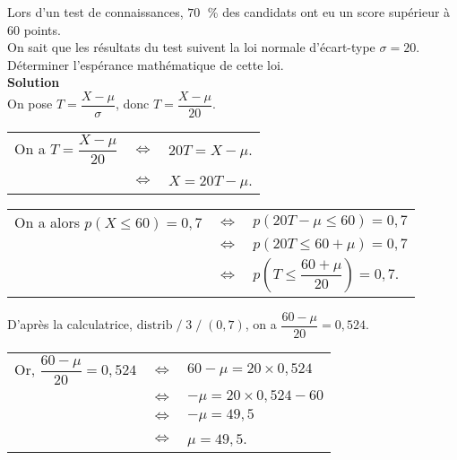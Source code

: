 Lors d'un test de connaissances, $70 \;$ \% des candidats ont eu un score supérieur à $60$ points. \\
On sait que les résultats du test suivent la loi normale d'écart-type $\sigma = 20$. \\

Déterminer l'espérance mathématique de cette loi. \\

\textbf{Solution} \\

On pose $T = \dfrac{X - \mu}{\sigma}$, donc $T = \dfrac{X - \mu}{20}$. \\

\begin{tabular}{lll}
\hspace*{-.3cm} On a $T = \dfrac{X - \mu}{20}$ & $\Longleftrightarrow$ & $20T = X - \mu$. \\
& $\Longleftrightarrow$ & $X = 20T - \mu$. \\
\end{tabular}

\vspace*{.3cm}

\begin{tabular}{lll}
\hspace*{-.3cm} On a alors $p\left(X \leqslant 60\right) = 0,7$ & $\Longleftrightarrow$ & $p\left(20T - \mu \leqslant 60\right) = 0,7$ \vspace*{.3cm} \\
& $\Longleftrightarrow$ & $p\left(20T \leqslant 60 + \mu\right) = 0,7$ \vspace*{.3cm} \\
& $\Longleftrightarrow$ & $p\left(T \leqslant \dfrac{60 + \mu}{20}\right) = 0,7$. \\
\end{tabular}

\vspace*{.3cm}

D'après la calculatrice, $\mathrm{distrib \;} / \; 3 \; / \; \left(0,7\right)$, on a $\dfrac{60 - \mu}{20} = 0,524$. \\

\begin{tabular}{lll}
\hspace*{-.3cm} Or, $\dfrac{60 - \mu}{20} = 0,524$ & $\Longleftrightarrow$ & $60 - \mu = 20 \times 0,524$ \vspace*{.3cm} \\
& $\Longleftrightarrow$ & $-\mu = 20 \times 0,524 - 60$ \vspace*{.3cm} \\
& $\Longleftrightarrow$ & $-\mu = 49,5$ \vspace*{.3cm} \\
& $\Longleftrightarrow$ & $\mu = 49,5$. \\
\end{tabular}

